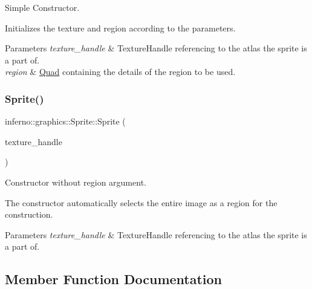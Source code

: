 Simple Constructor. 

Initializes the texture and region according to the parameters. 
\begin{DoxyParams}{Parameters}
{\em texture\+\_\+handle} & Texture\+Handle referencing to the atlas the sprite is a part of. \\
\hline
{\em region} & \mbox{\hyperlink{classinferno_1_1graphics_1_1_quad}{Quad}} containing the details of the region to be used. \\
\hline
\end{DoxyParams}
\mbox{\label{classinferno_1_1graphics_1_1_sprite_a8673ad1ca45d867e83355a1ad10b752a}} 
\subsubsection{\texorpdfstring{Sprite()}{Sprite()}\hspace{0.1cm}{\footnotesize\ttfamily [2/2]}}
{\footnotesize\ttfamily inferno\+::graphics\+::\+Sprite\+::\+Sprite (\begin{DoxyParamCaption}\item[{\mbox{\hyperlink{namespaceinferno_1_1graphics_a9d719bfbfedd17b9ace9b8d603ab5a38}{Texture\+Handle}}}]{texture\+\_\+handle }\end{DoxyParamCaption})\hspace{0.3cm}{\ttfamily [inline]}}



Constructor without region argument. 

The constructor automatically selects the entire image as a region for the construction. 
\begin{DoxyParams}{Parameters}
{\em texture\+\_\+handle} & Texture\+Handle referencing to the atlas the sprite is a part of. \\
\hline
\end{DoxyParams}


\subsection{Member Function Documentation}
\mbox{\label{classinferno_1_1graphics_1_1_sprite_ad2f468c9390d0d952f049daba69ef53f}} 
